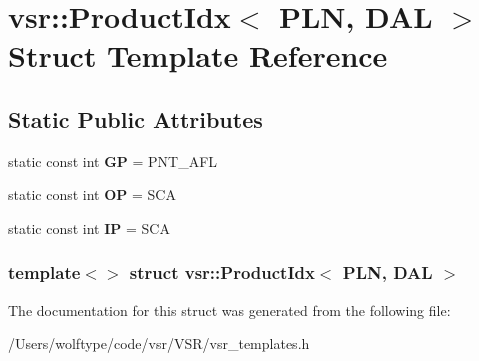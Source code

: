 \hypertarget{structvsr_1_1_product_idx_3_01_p_l_n_00_01_d_a_l_01_4}{\section{vsr\-:\-:Product\-Idx$<$ P\-L\-N, D\-A\-L $>$ Struct Template Reference}
\label{structvsr_1_1_product_idx_3_01_p_l_n_00_01_d_a_l_01_4}
}
\subsection*{Static Public Attributes}
\begin{DoxyCompactItemize}
\item 
\hypertarget{structvsr_1_1_product_idx_3_01_p_l_n_00_01_d_a_l_01_4_a06ec2a8ebaba4374ed73adf5773c1ec7}{static const int {\bfseries G\-P} = P\-N\-T\-\_\-\-A\-F\-L}\label{structvsr_1_1_product_idx_3_01_p_l_n_00_01_d_a_l_01_4_a06ec2a8ebaba4374ed73adf5773c1ec7}

\item 
\hypertarget{structvsr_1_1_product_idx_3_01_p_l_n_00_01_d_a_l_01_4_a40fbd69cd1af4e6d7184225a83c73ef3}{static const int {\bfseries O\-P} = S\-C\-A}\label{structvsr_1_1_product_idx_3_01_p_l_n_00_01_d_a_l_01_4_a40fbd69cd1af4e6d7184225a83c73ef3}

\item 
\hypertarget{structvsr_1_1_product_idx_3_01_p_l_n_00_01_d_a_l_01_4_a96bdaf2df197ac0a29d08d7db8eaad62}{static const int {\bfseries I\-P} = S\-C\-A}\label{structvsr_1_1_product_idx_3_01_p_l_n_00_01_d_a_l_01_4_a96bdaf2df197ac0a29d08d7db8eaad62}

\end{DoxyCompactItemize}
\subsubsection*{template$<$$>$ struct vsr\-::\-Product\-Idx$<$ P\-L\-N, D\-A\-L $>$}



The documentation for this struct was generated from the following file\-:\begin{DoxyCompactItemize}
\item 
/\-Users/wolftype/code/vsr/\-V\-S\-R/vsr\-\_\-templates.\-h\end{DoxyCompactItemize}
